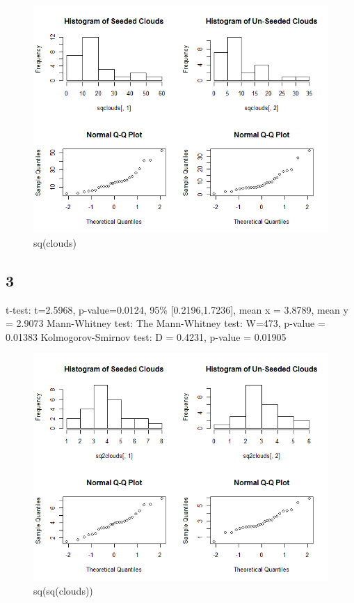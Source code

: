 \documentclass{article}
\begin{document}
    \begin{figure}[!htb]
      \includegraphics[scale=0.4]{../results/2_2.png}
      \caption{sq(clouds)}
      \label{fig:sq(clouds)}
    \end{figure}
    
    \subsection*{3}
    t-test: t=2.5968, p-value=0.0124, 95\% [0.2196,1.7236], mean x = 3.8789, mean y = 2.9073
    Mann-Whitney test: The Mann-Whitney test: W=473, p-value = 0.01383
    Kolmogorov-Smirnov test: D = 0.4231, p-value = 0.01905
    
    \begin{figure}[!htb]
      \includegraphics[scale=0.4]{../results/2_3.png}
      \caption{sq(sq(clouds))}
      \label{fig:sqsqclouds}
    \end{figure}
    
\end{document}
